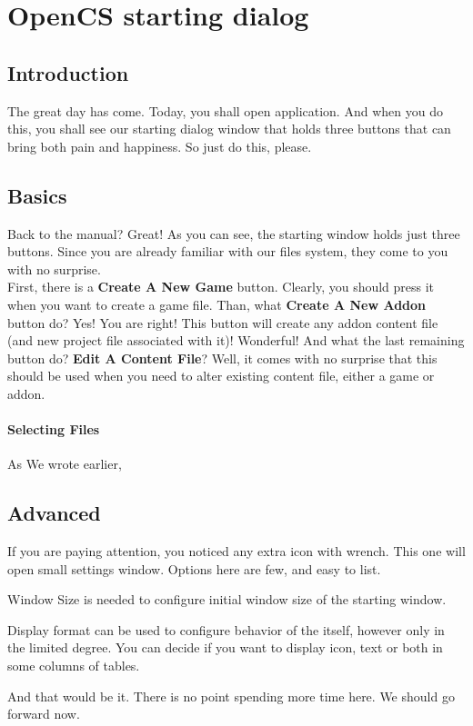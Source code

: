 \section{OpenCS starting dialog}
\subsection{Introduction}
The great day has come. Today, you shall open \OCS{} application. And when you do this, you shall see our starting dialog window that holds three buttons
that can bring both pain and happiness. So just do this, please.

\subsection{Basics}
Back to the manual? Great! As you can see, the starting window holds just three buttons. Since you are already familiar with our files system, they come
to you with no surprise.\\

First, there is a \textbf{Create A New Game} button. Clearly, you should press it when you want to create a game file. Than, what \textbf{Create A New Addon} button do?
Yes! You are right! This button will create any addon content file (and new project file associated with it)! Wonderful! And what the last remaining button do? \textbf{Edit A Content File}? Well, it comes with no surprise that this should be used when you need to alter existing content file, either a game or addon.\\

\paragraph{Selecting Files}
As We wrote earlier,

\subsection{Advanced}
If you are paying attention, you noticed any extra icon with wrench. This one will open small settings window. Options here are few, and easy to list.
\begin{description}
 \item {Window Size} is needed to configure initial window size of the starting window.
 \item {Display format} can be used to configure behavior of the \OCS{} itself, however only in the limited degree. You can decide if you want \OCS{} to display icon, text or both in some columns of tables.
\end{description}


And that would be it. There is no point spending more time here. We should go forward now.